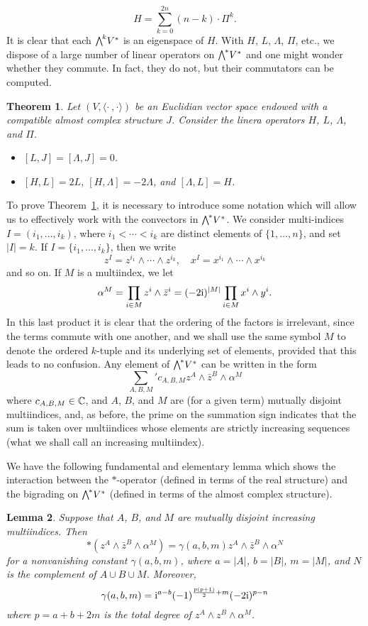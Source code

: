 \documentclass[11pt]{book}
\newtheorem{theorem}{Theorem}[section]
\newtheorem{lemma}[theorem]{Lemma}
\theoremstyle{definition}
\begin{document}
\[H=\sum_{k=0}^{2n}(n-k)\cdot\Pi^k.\]
It is clear that each $\bigw^kV^*$ is an eigenspace of $H$. With $H$, $L$, $\Lambda$, $\Pi$, etc., we dispose of a large number of linear operators on $\bigw^*V^*$ and one might wonder whether they commute. In fact, they do not, but their commutators can be computed.
\begin{theorem}\label{almost complex space sl(2,C) representation}
Let $(V,\langle\cdot\ ,\cdot\rangle)$ be an Euclidian vector space endowed with a compatible almost complex structure $J$. Consider the linera operators $H$, $L$, $\Lambda$, and $\Pi$.
\begin{itemize}
\item[(a)] $[L,J]=[\Lambda,J]=0$.
\item[(b)] $[H,L]=2L$, $[H,\Lambda]=-2\Lambda$, and $[\Lambda,L]=H$.
\end{itemize}
\end{theorem}
To prove Theorem~\ref{almost complex space sl(2,C) representation}, it is necessary to introduce some notation which will allow us to effectively work with the convectors in $\bigw^*V^*$. We consider multi-indices $I=(i_1,\dots,i_k)$, where $i_1<\cdots<i_k$ are distinct elements of $\{1,\dots,n\}$, and set $|I|=k$. If $I=\{i_1,\dots,i_k\}$, then we write
\[z^I=z^{i_1}\wedge\cdots\wedge z^{i_k},\quad x^I=x^{i_1}\wedge\cdots\wedge x^{i_k}\]
and so on. If $M$ is a multiindex, we let
\[\alpha^M=\prod_{i\in M}z^i\wedge\bar{z}^i=(-2\mathrm{i} )^{|M|}\prod_{i\in M}x^i\wedge y^i.\]
In this last product it is clear that the ordering of the factors is irrelevant, since the terms commute with one another, and we shall use the same symbol $M$ to denote the ordered $k$-tuple and its underlying set of elements, provided that this leads to no confusion. Any element of $\bigw^*V^*$ can be written in the form
\[\sum_{A,B,M}'c_{A,B,M}z^A\wedge\bar{z}^B\wedge\alpha^M\]
where $c_{A,B,M}\in\mathbb{C}$, and $A$, $B$, and $M$ are (for a given term) mutually disjoint multiindices, and, as before, the prime on the summation sign indicates that the sum is taken over multiindices whose elements are strictly increasing sequences (what we shall call an increasing multiindex).\par
We have the following fundamental and elementary lemma which shows the interaction between the $\ast$-operator (defined in terms of the real structure) and the bigrading on $\bigw^*V^*$ (defined in terms of the almost complex structure).
\begin{lemma}\label{almost complex space Hodge star on standard form lemma}
Suppose that $A$, $B$, and $M$ are mutually disjoint increasing multiindices. Then
\[\ast(z^A\wedge\bar{z}^B\wedge\alpha^M)=\gamma(a,b,m)z^A\wedge\bar{z}^B\wedge\alpha^N\]
for a nonvanishing constant $\gamma(a,b,m)$, where $a=|A|$, $b=|B|$, $m=|M|$, and $N$ is the complement of $A\cup B\cup M$. Moreover,
\[\gamma(a,b,m)=\mathrm{i}^{a-b}(-1)^{\frac{p(p+1)}{2}+m}(-2\mathrm{i})^{p-n}\]
where $p=a+b+2m$ is the total degree of $z^A\wedge z^B\wedge\alpha^M$.
\end{lemma}
\end{document}
